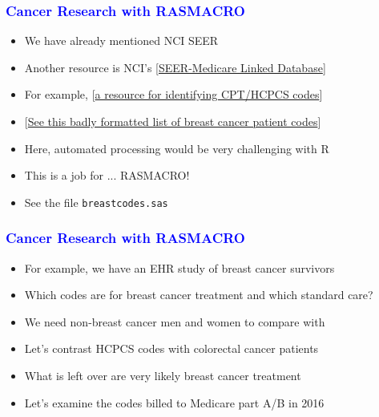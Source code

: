 \documentclass[11pt,pdftex,dvipsnames,usenames]{beamer}
\begin{document}
\begin{frame}[fragile]\frametitle{\bf\textcolor{blue}{Cancer Research with RASMACRO}}

\begin{itemize}
\item We have already mentioned NCI SEER
\item Another resource is NCI's
\textcolor{PineGreen}{[\href{https://healthcaredelivery.cancer.gov/seermedicare}
{SEER-Medicare Linked Database}]}
\item For example, \textcolor{PineGreen}{[\href{https://healthcaredelivery.cancer.gov/seermedicare/aboutdata/hcpcs.html}{a resource for identifying CPT/HCPCS codes}]}
\item   \textcolor{PineGreen}{[\href{https://healthcaredelivery.cancer.gov/seermedicare/aboutdata/breast.all.hcpcs.table.txt}{See
      this badly formatted list of breast cancer patient codes}]}
\item Here, automated processing would be very challenging with R
\item This is a job for ... RASMACRO!
\item See the file \texttt{breastcodes.sas}
\end{itemize}
\end{frame}


\begin{frame}[fragile]\frametitle{\bf\textcolor{blue}{Cancer Research with RASMACRO}}

\begin{itemize}
\item For example, we have an EHR study of breast cancer survivors
\item Which codes are for breast cancer treatment and which standard care?
\item We need non-breast cancer men and women to compare with
\item Let's contrast HCPCS codes with colorectal cancer patients
\item What is left over are very likely breast cancer treatment
\item Let's examine the codes billed to Medicare part A/B in 2016
\end{itemize}
\end{frame}
\end{document}
